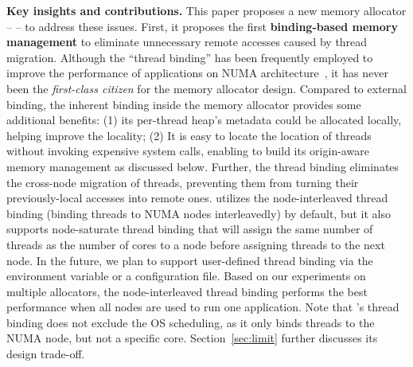 

\textbf{Key insights and contributions.} This paper proposes a new memory allocator -- \NM{} -- to address these issues.  
First, it proposes the first \textbf{binding-based memory management} to eliminate unnecessary remote accesses caused by thread migration. Although the ``thread binding'' has been frequently employed to improve the performance of applications on NUMA architecture~\cite{li2013numa, XuNuma, Lepers}, it has never been the \textit{first-class citizen} for the memory allocator design. Compared to external binding, the inherent  binding inside the memory allocator provides some additional benefits: (1) its per-thread heap's metadata could be allocated locally, helping improve the locality; (2) It is easy to locate the location of threads without invoking expensive system calls, enabling \NM{} to build its origin-aware memory management as discussed below. Further, the thread binding eliminates the cross-node migration of threads, preventing them from turning their previously-local accesses into remote ones. \NM{} utilizes the node-interleaved thread binding  (binding threads to NUMA nodes interleavedly) by default, but it also supports node-saturate thread binding that will assign the same number of threads as the number of cores to a node before assigning threads to the next node. In the future, we plan to support 
user-defined thread binding via the environment variable or a configuration file. Based on our experiments on multiple allocators, the node-interleaved thread binding performs the best performance when all nodes are used to run one application. Note that \NM{}'s thread binding does not exclude the OS scheduling, as it only binds threads to the NUMA node, but not a specific core. Section~\ref{sec:limit} further discusses its design trade-off.  

